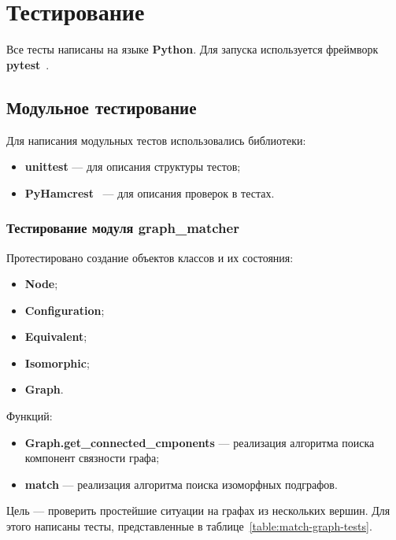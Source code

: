 \section{Тестирование}

Все тесты написаны на языке \textbf{Python}.
Для запуска используется фреймворк \textbf{pytest}~\cite{pytest}.

\subsection{Модульное тестирование}

Для написания модульных тестов использовались библиотеки:
\begin{itemize}
\item \textbf{unittest} --- для описания структуры тестов;
\item \textbf{PyHamcrest}~\cite{PyHamcrest} --- для описания проверок в тестах.
\end{itemize}

\subsubsection{Тестирование модуля graph\_matcher}

Протестировано создание объектов классов и их состояния:
\begin{itemize}
\item \textbf{Node};
\item \textbf{Configuration};
\item \textbf{Equivalent};
\item \textbf{Isomorphic};
\item \textbf{Graph}.
\end{itemize}

Функций:
\begin{itemize}
\item \textbf{Graph.get\_connected\_cmponents} --- реализация алгоритма поиска
компонент связности графа;
\item \textbf{match} --- реализация алгоритма поиска изоморфных подграфов.
\end{itemize}

Цель --- проверить простейшие ситуации на графах из нескольких вершин.
Для этого написаны тесты, представленные в таблице~\ref{table:match-graph-tests}.


